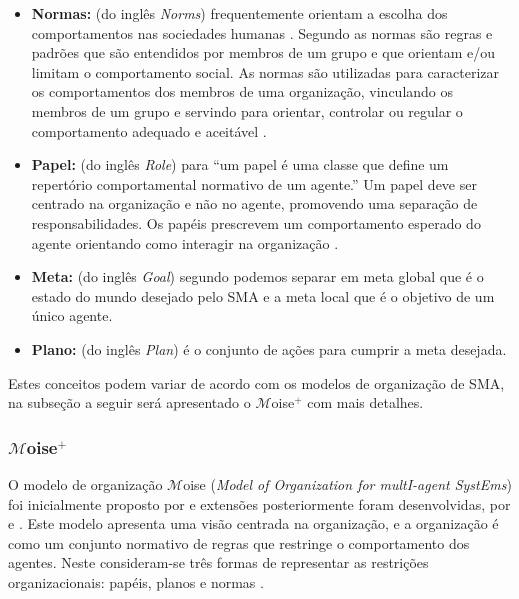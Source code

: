 \begin{itemize}

\item \textbf{Normas:} (do inglês \textit{Norms}) frequentemente orientam a escolha dos comportamentos nas sociedades humanas \cite{sen2007emergence}. Segundo \citet{cialdini1998social} as normas são regras e padrões que são entendidos por membros de um grupo e que orientam e/ou limitam o comportamento social. As normas são utilizadas para caracterizar os comportamentos dos membros de uma organização, vinculando os membros de um grupo e servindo para orientar, controlar ou regular o comportamento adequado e aceitável \cite{jennings2000agent}.

\item \textbf{Papel:} (do inglês \textit{Role}) para \citet{odell2002role} “um papel é uma classe que define um repertório comportamental normativo de um agente.” Um papel deve ser centrado na organização e não no agente, promovendo uma separação de responsabilidades. Os papéis prescrevem um comportamento esperado do agente orientando como interagir na organização \cite{tinnemeier2009roles}.

\item \textbf{Meta:} (do inglês \textit{Goal}) segundo \cite{hubner2003modelo} podemos separar em meta global que é o estado do mundo desejado pelo SMA e a meta local que é o objetivo de um único agente.

\item \textbf{Plano:} (do inglês \textit{Plan}) é o conjunto de ações para cumprir a meta desejada.
\end{itemize}

Estes conceitos podem variar de acordo com os modelos de organização de SMA, na subseção a seguir será apresentado o $\mathcal{M}$oise$^{+}$ com mais detalhes.

\subsubsection{$\mathcal{M}$oise$^{+}$}

O modelo de organização $\mathcal{M}$oise (\textit{Model of Organization for multI-agent SystEms}) foi inicialmente proposto por \cite{hannoun2000moise} e extensões posteriormente foram desenvolvidas, por \cite{hubner2003modelo} e \cite{hubner2005mathcal}. Este modelo apresenta uma visão centrada na organização, e a organização é como um conjunto normativo de regras que restringe o comportamento dos agentes. Neste consideram-se três formas de representar as restrições organizacionais: papéis, planos e normas \cite{hannoun2000moise}.

